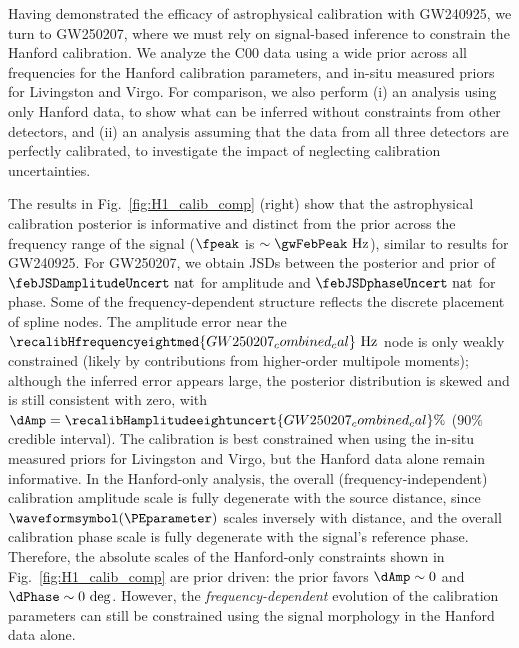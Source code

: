 Having demonstrated the efficacy of astrophysical calibration with \ac{GW240925}, we turn to \ac{GW250207}, where we must rely on signal-based inference to constrain the Hanford calibration.
We analyze the \ac{C00} data using a wide prior across all frequencies for the Hanford calibration parameters, and in-situ measured priors for Livingston and Virgo.
For comparison, we also perform (i) an analysis using only Hanford data, to show what can be inferred without constraints from other detectors, and (ii) an analysis assuming that the data from all three detectors are perfectly calibrated, to investigate the impact of neglecting calibration uncertainties.

The results in Fig.~\ref{fig:H1_calib_comp} (right) show that the astrophysical calibration posterior is informative and distinct from the prior across the frequency range of the signal ($\fpeak$ is $\sim\gwFebPeak~\mathrm{Hz}$), similar to results for \ac{GW240925}.
For \ac{GW250207}, we obtain \acp{JSD} between the posterior and prior of $\febJSDamplitudeUncert~\mathrm{nat}$ for amplitude and $\febJSDphaseUncert~\mathrm{nat}$ for phase.
Some of the frequency-dependent structure reflects the discrete placement of spline nodes.
The amplitude error near the $\recalibHfrequencyeightmed{GW250207_combined_cal}~\mathrm{Hz}$ node is only weakly constrained (likely by contributions from higher-order multipole moments); although the inferred error appears large, the posterior distribution is skewed and is still consistent with zero, with $\dAmp = \recalibHamplitudeeightuncert{GW250207_combined_cal}\%$ ($90\%$ credible interval).
The calibration is best constrained when using the in-situ measured priors for Livingston and Virgo, but the Hanford data alone remain informative.
In the Hanford-only analysis, the overall (frequency-independent) calibration amplitude scale is fully degenerate with the source distance, since $\waveformsymbol(\PEparameter)$ scales inversely with distance, and the overall calibration phase scale is fully degenerate with the signal's reference phase.
Therefore, the absolute scales of the Hanford-only constraints shown in Fig.~\ref{fig:H1_calib_comp} are prior driven: the prior favors $\dAmp \sim 0$ and $\dPhase \sim 0~\mathrm{deg}$.
However, the \emph{frequency-dependent} evolution of the calibration parameters can still be constrained using the signal morphology in the Hanford data alone.

